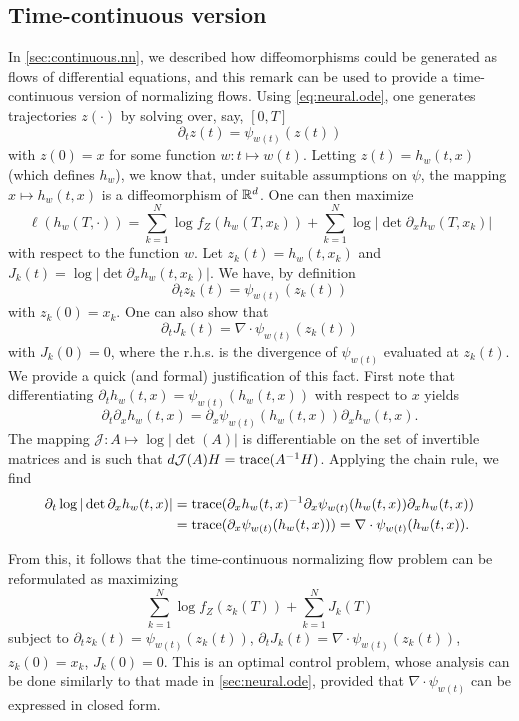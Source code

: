 \subsection{Time-continuous version}
In \cref{sec:continuous.nn}, we described how diffeomorphisms could be generated as flows of differential equations, and this remark can be used to provide a time-continuous version of normalizing flows. Using \cref{eq:neural.ode}, one generates trajectories $z(\cdot)$ by solving over, say, $[0, T]$
\[
\partial_t z(t) = \psi_{w(t)}(z(t))
\]
with $z(0) = x$ for some function $w: t\mapsto w(t)$. Letting $z(t) = h_{w}(t, x)$ (which defines $h_w$), we know that, under suitable assumptions on $\psi$, the mapping $x \mapsto h_w(t, x)$ is a diffeomorphism of ${\mathbb{R}}^d$. 
One can then maximize  
\[
\ell(h_w(T, \cdot)) = \sum_{k=1}^N \log f_Z(h_w(T, x_k)) + \sum_{k=1}^N \log |\det{\partial_x h_w(T, x_k)}|
\]
with respect to the function $w$. Let $z_k(t) = h_w(t, x_k)$ and $J_k(t) = \log |\det{\partial_x h_w(t, x_k)}|$. We have, by definition 
\[
\partial_t z_k(t) = \psi_{w(t)}(z_k(t))
\]
with $z_k(0) = x_k$. One can also show that
\[
\partial_t J_k(t) = \nabla\cdot \psi_{w(t)}(z_k(t))
\]
with $J_k(0) = 0$,
where the r.h.s. is the divergence of $\psi_{w(t)}$ evaluated at $z_k(t)$. We provide a quick (and formal) justification of this fact. First note that differentiating $\partial_t h_w(t,x) = \psi_{w(t)}(h_w(t,x))$ with respect to $x$ yields
\[
\partial_t \partial_x h_w(t,x) = \partial_x \psi_{w(t)}(h_w(t,x)) \partial_x h_w(t,x).
\] 
The mapping $\mathcal J: A \mapsto \log |\det(A)|$ is differentiable on the set of invertible matrices and is such that $d\mathcal J(A) H = {\mathrm{trace}}(A^{-1}H)$. Applying the chain rule, we find
\begin{align*}
\partial_t \log|\det{\partial_x h_w(t,x)}| &= {\mathrm{trace}}(\partial_x h_w(t,x)^{-1} \partial_x \psi_{w(t)}(h_w(t,x)) \partial_x h_w(t,x))\\
& = 
{\mathrm{trace}}(\partial_x \psi_{w(t)}(h_w(t,x))) = \nabla\cdot \psi_{w(t)}(h_w(t,x)).
\end{align*}

From this, it follows that the time-continuous normalizing flow problem can be reformulated as maximizing
\[
\sum_{k=1}^N \log f_Z(z_k(T)) + \sum_{k=1}^N J_k(T)
\]
subject to $\partial_t z_k(t) = \psi_{w(t)}(z_k(t))$, 
$\partial_t J_k(t) = \nabla\cdot \psi_{w(t)}(z_k(t))$, $z_k(0)=x_k$, $J_k(0) = 0$. This is an optimal control problem, whose analysis can be done similarly to that made in \cref{sec:neural.ode}, provided that $\nabla\cdot \psi_{w(t)}$ can be expressed in closed form.

